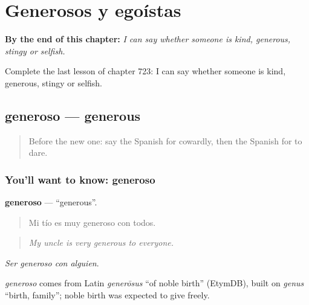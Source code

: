 
\chapter{Generosos y egoístas}
\label{ch:es-generosos-y-egoistas}

\begin{chapteropening}
\textbf{By the end of this chapter:} \emph{I can say whether someone is kind, generous, stingy or selfish.}

Complete the last lesson of chapter 723: I can say whether someone is kind, generous, stingy or selfish.
\end{chapteropening}

\section[generoso]{generoso — generous}

\label{lesson:ES-C723-generoso}



\begin{quote}
Before the new one: say the Spanish for cowardly, then the Spanish for to dare.
\end{quote}

\subsection*{You'll want to know: generoso}
\textbf{generoso} — \textquotedblleft{}generous\textquotedblright{}.

\begin{quote}
Mi tío es muy generoso con todos.
\end{quote}

\begin{quote}
\emph{My uncle is very generous to everyone.}
\end{quote}

\emph{Ser generoso con alguien}.

\begin{cousinweb}
\emph{generoso} comes from Latin \emph{generōsus} \textquotedblleft{}of noble birth\textquotedblright{} (EtymDB), built on \emph{genus} \textquotedblleft{}birth, family\textquotedblright{}; noble birth was expected to give freely.
\end{cousinweb}

